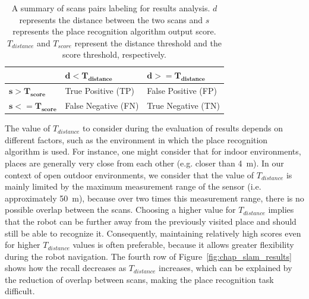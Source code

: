 \begin{table}[H]
    \centering
    \begin{tabular}{@{}l|ll@{}}
        \toprule
                                  & $\mathbf{d < T_{distance}}$ & $\mathbf{d >= T_{distance}}$ \\
        \hline
        $\mathbf{s > T_{score}}$  & True Positive (TP)          & False Positive (FP) \\
        $\mathbf{s <= T_{score}}$ & False Negative (FN)         & True Negative (TN) \\
        \bottomrule
    \end{tabular}
    \caption[Summary of scans pairs labeling for results analysis.]{A summary of scans pairs labeling for results analysis. $d$ represents the distance between the two scans and $s$ represents the place recognition algorithm output score. $T_{distance}$ and $T_{score}$ represent the distance threshold and the score threshold, respectively.}
    \label{tab:chap_slam_results_labeling}
\end{table}

The value of $T_{distance}$ to consider during the evaluation of results depends on different factors, such as the environment in which the place recognition algorithm is used. For instance, one might consider that for indoor environments, places are generally very close from each other (e.g. closer than \SI{4}{\meter}). In our context of open outdoor environments, we consider that the value of $T_{distance}$ is mainly limited by the maximum measurement range of the sensor (i.e. approximately \SI{50}{\meter}), because over two times this measurement range, there is no possible overlap between the scans. Choosing a higher value for $T_{distance}$ implies that the robot can be further away from the previously visited place and should still be able to recognize it. Consequently, maintaining relatively high scores even for higher $T_{distance}$ values is often preferable, because it allows greater flexibility during the robot navigation. The fourth row of Figure~\ref{fig:chap_slam_results} shows how the recall decreases as $T_{distance}$ increases, which can be explained by the reduction of overlap between scans, making the place recognition task difficult.

